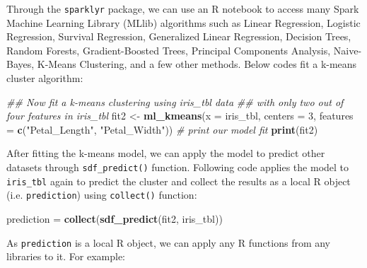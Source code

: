 \documentclass[12pt,]{krantz}
\makeatletter
\newenvironment{Shaded}{\begin{snugshade}}{\end{snugshade}}
\newcommand{\CommentTok}[1]{\textcolor[rgb]{0.37,0.37,0.37}{\textit{#1}}}
\newcommand{\DataTypeTok}[1]{\textcolor[rgb]{0.27,0.27,0.27}{#1}}
\newcommand{\DecValTok}[1]{\textcolor[rgb]{0.06,0.06,0.06}{#1}}
\newcommand{\KeywordTok}[1]{\textcolor[rgb]{0.27,0.27,0.27}{\textbf{#1}}}
\newcommand{\NormalTok}[1]{#1}
\newcommand{\StringTok}[1]{\textcolor[rgb]{0.5,0.5,0.5}{#1}}
\newenvironment{kframe}{%
\medskip{}
\setlength{\fboxsep}{.8em}
 \def\at@end@of@kframe{}%
 \ifinner\ifhmode%
  \def\at@end@of@kframe{\end{minipage}}%
  \begin{minipage}{\columnwidth}%
 \fi\fi%
 \def\FrameCommand##1{\hskip\@totalleftmargin \hskip-\fboxsep
 \colorbox{shadecolor}{##1}\hskip-\fboxsep
     \hskip-\linewidth \hskip-\@totalleftmargin \hskip\columnwidth}%
 \MakeFramed {\advance\hsize-\width
   \@totalleftmargin\z@ \linewidth\hsize
   \@setminipage}}%
 {\par\unskip\endMakeFramed%
 \at@end@of@kframe}
\renewenvironment{Shaded}{\begin{kframe}}{\end{kframe}}
\makeatother
\begin{document}
Through the \texttt{sparklyr} package, we can use an R notebook to access many Spark Machine Learning Library (MLlib) algorithms such as Linear Regression, Logistic Regression, Survival Regression, Generalized Linear Regression, Decision Trees, Random Forests, Gradient-Boosted Trees, Principal Components Analysis, Naive-Bayes, K-Means Clustering, and a few other methods. Below codes fit a k-means cluster algorithm:

\begin{Shaded}
\begin{Highlighting}[]
\CommentTok{## Now fit a k-means clustering using iris_tbl data}
\CommentTok{## with only two out of four features in iris_tbl}
\NormalTok{fit2 <-}\StringTok{ }\KeywordTok{ml_kmeans}\NormalTok{(}\DataTypeTok{x =}\NormalTok{ iris_tbl, }\DataTypeTok{centers =} \DecValTok{3}\NormalTok{,}
                    \DataTypeTok{features =} \KeywordTok{c}\NormalTok{(}\StringTok{"Petal_Length"}\NormalTok{, }\StringTok{"Petal_Width"}\NormalTok{))}
\CommentTok{# print our model fit}
\KeywordTok{print}\NormalTok{(fit2)}
\end{Highlighting}
\end{Shaded}

After fitting the k-means model, we can apply the model to predict other datasets through \texttt{sdf\_predict()} function. Following code applies the model to \texttt{iris\_tbl} again to predict the cluster and collect the results as a local R object (i.e. \texttt{prediction}) using \texttt{collect()} function:

\begin{Shaded}
\begin{Highlighting}[]
\NormalTok{prediction =}\StringTok{ }\KeywordTok{collect}\NormalTok{(}\KeywordTok{sdf_predict}\NormalTok{(fit2, iris_tbl))}
\end{Highlighting}
\end{Shaded}

As \texttt{prediction} is a local R object, we can apply any R functions from any libraries to it. For example:
\end{document}
